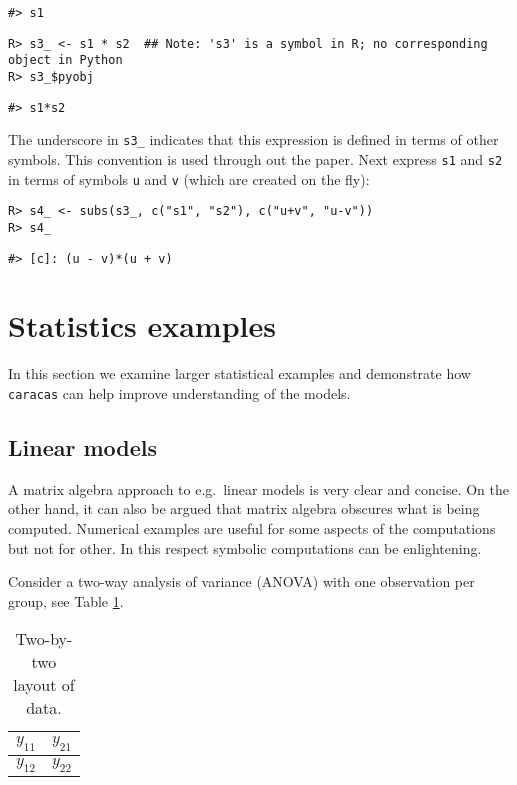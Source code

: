 \begin{verbatim}
#> s1
\end{verbatim}

\begin{verbatim}
R> s3_ <- s1 * s2  ## Note: 's3' is a symbol in R; no corresponding object in Python
R> s3_$pyobj
\end{verbatim}

\begin{verbatim}
#> s1*s2
\end{verbatim}

The underscore in \texttt{s3\_} indicates that this expression
is defined in terms of other symbols. This convention is used through out the paper.
Next express \texttt{s1} and \texttt{s2} in terms of symbols \texttt{u} and \texttt{v} (which are created on the fly):

\begin{verbatim}
R> s4_ <- subs(s3_, c("s1", "s2"), c("u+v", "u-v"))
R> s4_
\end{verbatim}

\begin{verbatim}
#> [c]: (u - v)*(u + v)
\end{verbatim}

\hypertarget{statistics-examples}{%
\section{Statistics examples}\label{statistics-examples}}

In this section we examine larger statistical examples and
demonstrate how \texttt{caracas} can help improve understanding of the models.

\hypertarget{linear-models}{%
\subsection{Linear models}\label{linear-models}}

A matrix algebra approach to e.g.~linear models is very clear and
concise. On the other hand, it can also be argued that matrix algebra
obscures what is being computed. Numerical examples are useful for
some aspects of the computations but not for other. In this respect
symbolic computations can be enlightening.

Consider a two-way analysis of variance (ANOVA) with one observation
per group, see Table \ref{tab:anova-two-way-table}.

\begin{table}[!h]

\caption{\label{tab:anova-two-way-table}Two-by-two layout of data.}
\centering
\begin{tabular}[t]{|>{}l|>{}l|}
\hline
$y_{11}$ & $y_{21}$\\
\hline
$y_{12}$ & $y_{22}$\\
\hline
\end{tabular}
\end{table}

